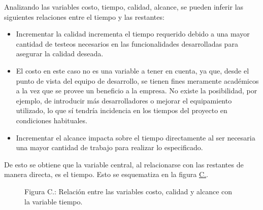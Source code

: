 \documentclass[a4paper, 12pt,twoside]{report}  %
\numberwithin{equation}{subsection} %
\begin{document}
  \setcounter{counter_img_C}{1}
  \setcounter{counter_tbl_C}{1}

\indent Analizando las variables costo, tiempo, calidad, alcance, se pueden inferir las siguientes relaciones entre el tiempo y las restantes:
\begin{itemize}
	\item Incrementar la calidad incrementa el tiempo requerido debido a una mayor cantidad de testeos necesarios en las funcionalidades desarrolladas para asegurar la calidad deseada.
	\item El costo en este caso no es una variable a tener en cuenta, ya que, desde el punto de vista del equipo de desarrollo, se tienen fines meramente académicos a la vez que se provee un beneficio a la empresa. No existe la posibilidad, por ejemplo, de introducir más desarrolladores o mejorar el equipamiento utilizado, lo que sí tendría incidencia en los tiempos del proyecto en condiciones habituales.
	\item Incrementar el alcance impacta sobre el tiempo directamente al ser necesaria una mayor cantidad de trabajo para realizar lo especificado.
\end{itemize}
De esto se obtiene que la variable central, al relacionarse con las restantes de manera directa, es el tiempo. Esto se esquematiza en la figura \hyperref[relacion variables del proyecto]{C.}.

\begin{figure}[h!]
	\centering
	{%
		\setlength{\fboxsep}{0pt}%
		\setlength{\fboxrule}{0.5pt}%
	}%
	\caption*{Figura C.: Relación entre las variables costo, calidad y alcance con la variable tiempo.}
	\label{relacion variables del proyecto}
\end{figure}
\end{document}
